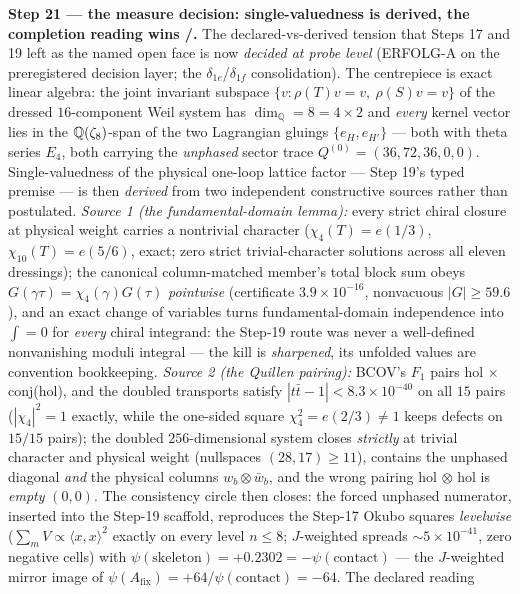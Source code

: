 \documentclass[11pt,a4paper]{article}
\theoremstyle{definition}
\begin{document}
\par\smallskip\noindent\textbf{Step 21 --- the measure decision: single-valuedness is derived,
the completion reading wins \mE/\mC.} The declared-vs-derived tension that Steps 17 and 19 left
as the named open face is now \emph{decided at probe level} (ERFOLG-A on the preregistered
decision layer; the $\delta_{1e}$/$\delta_{1f}$ consolidation). The centrepiece is exact linear
algebra: the joint invariant subspace $\{v:\rho(T)v=v,\ \rho(S)v=v\}$ of the dressed
$16$-component Weil system has $\dim_{\mathbb Q}=8=4\times2$ and \emph{every} kernel vector
lies in the $\mathbb{Q}(\zeta_8)$-span of the two Lagrangian gluings $\{e_H,e_{H'}\}$ --- both with
theta series $E_4$, both carrying the \emph{unphased} sector trace $Q^{(0)}=(36,72,36,0,0)$.
Single-valuedness of the physical one-loop lattice factor --- Step 19's typed premise --- is
then \emph{derived} from two independent constructive sources rather than postulated.
\emph{Source 1 (the fundamental-domain lemma):} every strict chiral closure at physical weight
carries a nontrivial character ($\chi_4(T)=e(1/3)$, $\chi_{10}(T)=e(5/6)$, exact; zero strict
trivial-character solutions across all eleven dressings); the canonical column-matched member's
total block sum obeys $G(\gamma\tau)=\chi_4(\gamma)G(\tau)$ \emph{pointwise} (certificate
$3.9\times10^{-16}$, nonvacuous $|G|\ge59.6$), and an exact change of variables turns
fundamental-domain independence into $\int=0$ for \emph{every} chiral integrand: the Step-19
route was never a well-defined nonvanishing moduli integral --- the kill is \emph{sharpened},
its unfolded values are convention bookkeeping. \emph{Source 2 (the Quillen pairing):} BCOV's
$F_1$ pairs hol$\,\times\,$conj(hol), and the doubled transports satisfy
$|t\bar t-1|<8.3\times10^{-40}$ on all $15$ pairs ($|\chi_4|^2=1$ exactly, while the one-sided
square $\chi_4^2=e(2/3)\neq1$ keeps defects on $15/15$ pairs); the doubled $256$-dimensional
system closes \emph{strictly} at trivial character and physical weight (nullspaces
$(28,17)\ge11$), contains the unphased diagonal \emph{and} the physical columns
$w_b\otimes\bar w_b$, and the wrong pairing hol$\,\otimes\,$hol is \emph{empty} $(0,0)$. The
consistency circle then closes: the forced unphased numerator, inserted into the Step-19
scaffold, reproduces the Step-17 Okubo squares \emph{levelwise} ($\sum_mV\propto\langle
x,x\rangle^2$ exactly on every level $n\le8$; $J$-weighted spreads $\sim5\times10^{-41}$, zero
negative cells) with $\psi(\text{skeleton})=+0.2302=-\psi(\text{contact})$ --- the $J$-weighted
mirror image of $\psi(A_{\mathrm{fix}})=+64$/$\psi(\text{contact})=-64$. The declared reading
\end{document}
